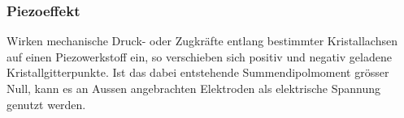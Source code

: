\subsubsection{Piezoeffekt}
Wirken mechanische Druck- oder Zugkräfte entlang bestimmter Kristallachsen auf einen Piezowerkstoff ein, so verschieben sich positiv und negativ geladene Kristallgitterpunkte. Ist das dabei entstehende Summendipolmoment grösser Null, kann es an Aussen angebrachten Elektroden als elektrische Spannung genutzt werden.